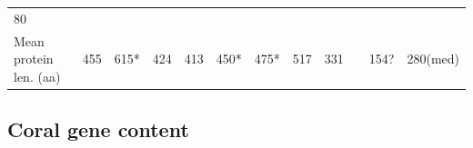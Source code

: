 \documentclass[]{elsarticle} %
\begin{document}
\begin{longtable}[]{@{}llllllllllll@{}}
\begin{minipage}[t]{0.05\columnwidth}
80\strut
\end{minipage}\tabularnewline
\begin{minipage}[t]{0.15\columnwidth}\raggedright\strut
Mean protein len. (aa)\strut
\end{minipage} & \begin{minipage}[t]{0.05\columnwidth}\raggedright\strut
455\strut
\end{minipage} & \begin{minipage}[t]{0.05\columnwidth}\raggedright\strut
615*\strut
\end{minipage} & \begin{minipage}[t]{0.05\columnwidth}\raggedright\strut
424\strut
\end{minipage} & \begin{minipage}[t]{0.05\columnwidth}\raggedright\strut
413\strut
\end{minipage} & \begin{minipage}[t]{0.05\columnwidth}\raggedright\strut
450*\strut
\end{minipage} & \begin{minipage}[t]{0.05\columnwidth}\raggedright\strut
475*\strut
\end{minipage} & \begin{minipage}[t]{0.05\columnwidth}\raggedright\strut
517\strut
\end{minipage} & \begin{minipage}[t]{0.05\columnwidth}\raggedright\strut
331\strut
\end{minipage} & \begin{minipage}[t]{0.05\columnwidth}\raggedright\strut
\strut
\end{minipage} & \begin{minipage}[t]{0.05\columnwidth}\raggedright\strut
154?\strut
\end{minipage} & \begin{minipage}[t]{0.05\columnwidth}\raggedright\strut
280(med)\strut
\end{minipage}\tabularnewline
\bottomrule
\end{longtable}

\subsection{Coral gene content}\label{coral-gene-content}
\end{document}

